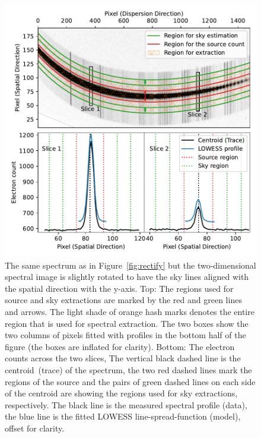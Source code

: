 \documentclass[linenumbers, twocolumn]{aastex631}
\begin{document}
\begin{figure}
    \centering
    \includegraphics[width=\columnwidth]{fig_03_extraction_profile.pdf}
    \caption{The same spectrum as in Figure~\ref{fig:rectify} but the
    two-dimensional spectral image is slightly rotated to have the sky lines
    aligned with the spatial direction with the y-axis.
    Top: The regions used for source and sky extractions are marked
    by the red and green lines and arrows. The light shade of orange
    hash marks denotes the entire region that is used for spectral extraction.
    The two boxes show the two columns of pixels fitted with
    profiles in the bottom half of the figure (the boxes are inflated
    for clarity). Bottom: The electron counts across the two slices,
    The vertical black dashed line is the centroid~(trace) of the spectrum,
    the two red dashed lines mark the regions of the source and the
    pairs of green dashed lines on each side of the centroid are
    showing the regions used for sky extractions, respectively. The
    black line is the measured spectral profile (data), the blue
    line is the fitted LOWESS line-spread-function (model), offset for
    clarity.}
    \label{fig:extraction}
\end{figure}

\end{document}
